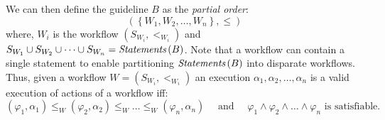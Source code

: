 
We can then define the guideline $B$ as the \emph{partial order}:
\begin{equation}
  \left(\left\{W_1,W_2,\dots,W_n\right\}, \leq\right)
\end{equation}
where, $W_i$ is the workflow $\left(S_{W_i}, <_{W_i}\right)$ and
$S_{W_1} \cup S_{W_2} \cup \dots \cup S_{W_n} = \textit{Statements}\left(B\right)$. Note that a
workflow can contain a single statement to enable partitioning $\textit{Statements}\left(B\right)$
into disparate workflows. Thus, given a workflow $W =\left(S_{W_i},
    <_{W_i}\right)$  an execution
$\alpha_1,\alpha_2,\dots,\alpha_n$ is a valid execution of actions of a workflow
iff:
\begin{equation}
  \left(\varphi_1,\alpha_1\right) \leq_W \left(\varphi_2,\alpha_2\right) \leq_W \dots \leq_W \left(\varphi_n,\alpha_n\right)
  \quad\text{ and }\quad
  \varphi_1 \wedge \varphi_2 \wedge \dots \wedge \varphi_n \text{ is satisfiable.}
\end{equation}

